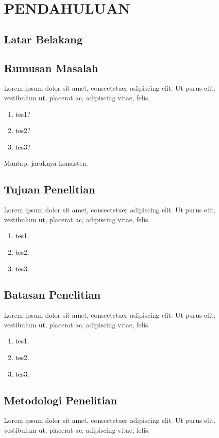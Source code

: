 \chapter{PENDAHULUAN}

\section{Latar Belakang}
\lipsum[1-4]

\section{Rumusan Masalah}
Lorem ipsum dolor sit amet, consectetuer adipiscing elit. Ut purus elit, vestibulum
ut, placerat ac, adipiscing vitae, felis.
\begin{enumerate}
    \item tes1?
    \item tes2?
    \item tes3?
\end{enumerate}
Mantap, jaraknya konsisten.

\section{Tujuan Penelitian}
Lorem ipsum dolor sit amet, consectetuer adipiscing elit. Ut purus elit, vestibulum
ut, placerat ac, adipiscing vitae, felis.
\begin{enumerate}
    \item tes1.
    \item tes2.
    \item tes3.
\end{enumerate}

\section{Batasan Penelitian} %
Lorem ipsum dolor sit amet, consectetuer adipiscing elit. Ut purus elit, vestibulum
ut, placerat ac, adipiscing vitae, felis.
\begin{enumerate}
    \item tes1.
    \item tes2.
    \item tes3.
\end{enumerate}

\section{Metodologi Penelitian}
Lorem ipsum dolor sit amet, consectetuer adipiscing elit. Ut purus elit, vestibulum
ut, placerat ac, adipiscing vitae, felis.